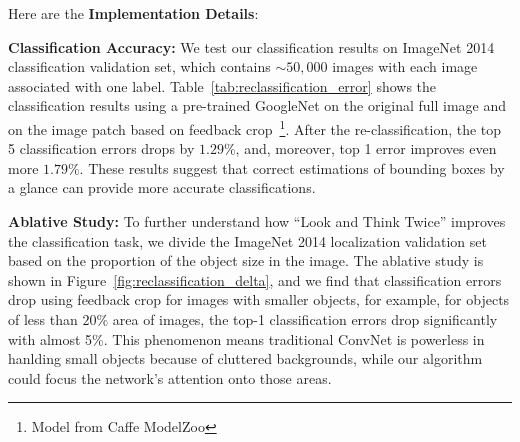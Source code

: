 Here are the \textbf{Implementation Details}:
\begin{center}
\end{center}

\textbf{Classification Accuracy:} We test our classification results on ImageNet 2014 classification validation set, which contains $\sim50,000$ images with each image associated with one label. Table~\ref{tab:reclassification_error} shows the classification results using a pre-trained GoogleNet on the original full image and on the image patch based on feedback crop~\footnote{Model from Caffe ModelZoo}. After the re-classification, the top 5 classification errors drops by $1.29\%$, and, moreover, top 1 error improves even more $1.79\%$. These results suggest that correct estimations of bounding boxes by a glance can provide more accurate classifications.

\textbf{Ablative Study:} To further understand how ``Look and Think Twice'' improves the classification task, we divide the ImageNet 2014 localization validation set based on the proportion of the object size in the image. The ablative study is shown in Figure~\ref{fig:reclassification_delta}, and we find that classification errors drop using feedback crop for images with smaller objects, for example, for objects of less than $20\%$ area of images, the top-1 classification errors drop significantly with almost 5\%.
This phenomenon means traditional ConvNet is powerless in hanlding small objects because of cluttered backgrounds, while our algorithm could focus the network's attention onto those areas.

